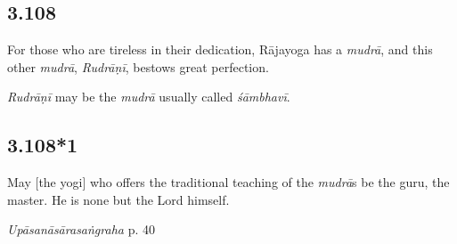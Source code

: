 \begin{ekdosis}
\subsection*{3.108}
\begin{translation}[hp03_108]
For those who are tireless in their dedication, Rājayoga has a \emph{mudrā}, and this other \emph{mudrā}, \emph{Rudrāṇī}, bestows great perfection.
\end{translation}



\begin{philcomm}[hp03_108]
\emph{Rudrāṇī} may be the \emph{mudrā} usually called \emph{śāmbhavī}.

\end{philcomm}

\subsection*{3.108*1}
\begin{translation}[hp03_108_1]
May [the yogi] who offers the traditional teaching of the \emph{mudrā}s be the guru, the master. He is none but the Lord himself.
\end{translation}


\begin{testimonia}[hp03_108_1]
\emph{Upāsanāsārasaṅgraha} p. 40 %
\begin{versinnote}
\end{versinnote}
\end{testimonia}


\end{ekdosis}
